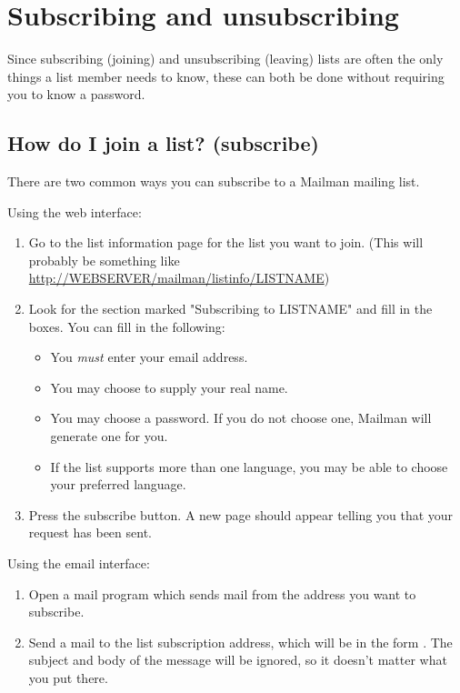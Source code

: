 \documentclass{howto}
\begin{document}
\section{Subscribing and unsubscribing}
Since subscribing (joining) and unsubscribing (leaving) lists are often the 
only things a list member needs to know, these can both be done without 
requiring you to know a password.

\subsection{How do I join a list? (subscribe)\label{sec:subscribe}}

There are two common ways you can subscribe to a Mailman mailing list. 

Using the web interface:
\begin{enumerate}
	\item Go to the list information page for the list you want to join. 
	(This will probably be something like 
	\url{http://WEBSERVER/mailman/listinfo/LISTNAME})
	\item Look for the section marked "Subscribing to LISTNAME" and fill in the 
	boxes.  You can fill in the following:
	\begin{itemize}
		\item You \emph{must} enter your email address.
		\item You may choose to supply your real name.
		\item You may choose a password.   If you do not choose one, Mailman will
		 generate one for you.  

		\item If the list supports more than one language, you may be able to 
		choose your preferred language.  
	\end{itemize}
	\item Press the subscribe button.  A new page should appear telling you 
	that your request has been sent.
\end{enumerate}

Using the email interface:
\begin{enumerate}
	\item Open a mail program which sends mail from the address you want to
	subscribe.
	\item Send a mail to the list subscription address, which will be in the 
	form .  The subject and body
	of the message will be ignored, so it doesn't matter what you put there.
\end{enumerate}
\end{document}
